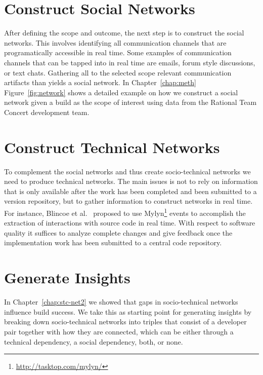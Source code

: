 \section{Construct Social Networks}
After  defining the scope and outcome, the next step is to construct the social networks.
This involves identifying all communication channels that are programatically accessible in real time.
Some examples of communication channels that can be tapped into in real time are emails, forum style discussions, or text chats.
Gathering all to the selected scope relevant communication artifacts than yields a social network.
In Chapter~\ref{chap:meth} Figure~\ref{fig:network} shows a detailed  example on how we construct a social network given a build as the scope of interest using data from the Rational Team Concert development team.

\section{Construct Technical Networks}
To complement the social networks and thus create socio-technical networks we need to produce technical networks.
The main issues is not to rely on information that is only available after the work has been completed and been submitted to a version repository, but to gather information to construct networks in real time.
For instance, Blincoe et al.~\cite{blincoe:cscw:2012} proposed to use Mylyn\footnote{\url{http://tasktop.com/mylyn/}} events to accomplish the extraction of interactions with source code in real time.
%
With respect to software quality it suffices to analyze complete changes and give feedback once the implementation work has been submitted to a central code repository.

\section{Generate Insights}
In Chapter~\ref{chap:stc-net2} we showed that gaps in socio-technical networks influence build success.
We take this as starting point for generating insights by breaking down socio-technical networks into triples that consist of a developer pair together with how they are connected, which can be either through a technical dependency, a social dependency, both, or none.

